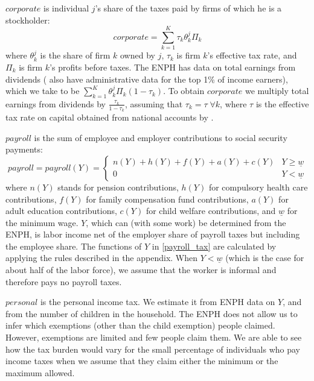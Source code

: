 \documentclass[12pt]{article}
\begin{document}
$corporate$ is individual $j$'s share of
the taxes paid by firms of which he is a stockholder:
\begin{equation}
corporate = \sum^{K}_{k=1} \tau_k\theta^j_k\Pi_k
\end{equation}
where $\theta^j_k$ is the share of firm $k$ owned by $j$,
$\tau_k$ is firm $k$'s effective tax rate,
and $\Pi_k$ is firm $k$'s profits before taxes.
The ENPH has data on total earnings from dividends
(\citet{juliana} also have administrative data for the top 1\% of income earners),
which we take to be $\sum^{K}_{k=1} \theta^j_k\Pi_k(1-\tau_k)$.
To obtain $corporate$ we multiply total earnings from dividends by
$\frac{\tau_k}{1-\tau_k}$,
assuming that $\tau_k=\tau \; \forall k$,
where $\tau$ is the effective tax rate on capital
obtained from national accounts by \citet{banrep}.
\iffalse
[[Someone:
    I'm unaware of any place in the code that does this,
    and pretty sure that's because there isn't one.
    Maybe Luis or David was computing it by hand.
    --jbb]]
\fi

$payroll$ is the sum of employee and employer contributions to social security payments:
\begin{equation} \label{payroll_tax}
payroll = payroll(Y)=
  \begin{cases}
	n(Y)+h(Y)+f(Y)+a(Y)+c(Y) & Y \geq \underline{w} \\
	0 &  Y < \underline{w}
  \end{cases}
\end{equation}
where  $n(Y)$ stands for pension contributions,
$h(Y)$ for compulsory health care contributions,
$f(Y)$ for family compensation fund contributions,
$a(Y)$ for adult education contributions,
$c(Y)$ for child welfare contributions,
and $\underline{w}$ for the minimum wage.
$Y$, which can (with some work) be determined from the ENPH,
is labor income net of the employer share of payroll taxes
but including the employee share.
The functions of $Y$ in \ref{payroll_tax} are calculated by
applying the rules described in the appendix.
When $Y < \underline{w}$
(which is the case for about half of the labor force),
we assume that the worker is informal and therefore pays no payroll taxes.

$personal$ is the personal income tax.
We estimate it from ENPH data on $Y$,
and from the number of children in the household.
The ENPH does not allow us to infer which exemptions
(other than the child exemption) people claimed.
However, exemptions are limited and few people claim them.
We are able to see how the tax burden would vary
for the small percentage of individuals who pay income taxes
when we assume that they claim either the minimum or the maximum allowed.
\end{document}
